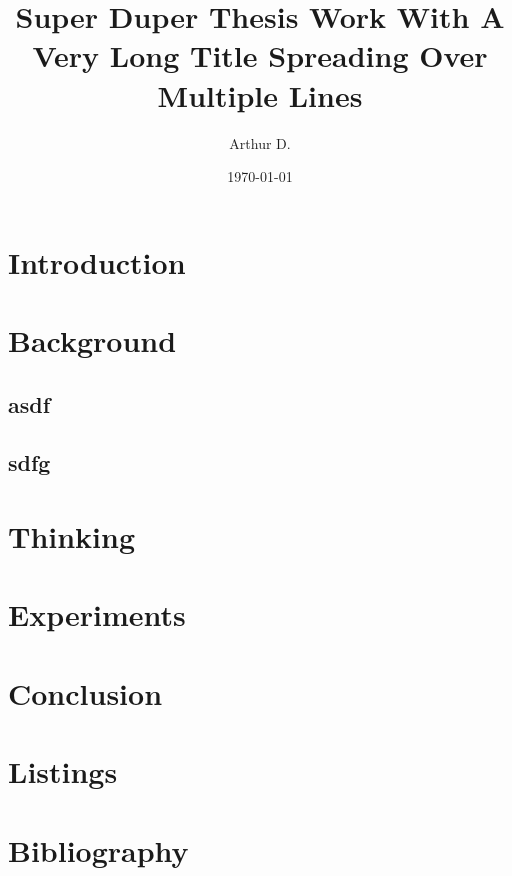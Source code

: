 \documentclass[
]{stsreprt}
\author{Arthur D.}
\title{Super Duper Thesis Work With A Very Long Title Spreading Over Multiple Lines}
\date{\today}
\begin{document}
\frontmatter
\maketitle
\tableofcontents
\listoffigures{}
\mainmatter
\chapter{Introduction}
\lipsum[1-19]
\chapter{Background}
\section{asdf}
\lipsum[10-19]
\section{sdfg}
\lipsum[20-39]
\chapter{Thinking}
\lipsum[40-69]
\chapter{Experiments}
\lipsum[70-89]

\chapter{Conclusion}
\lipsum[80-99]
\appendix
\chapter{Listings}
\lipsum[90-99]
\backmatter
\chapter{Bibliography}
\lipsum[100-110]
\end{document}
